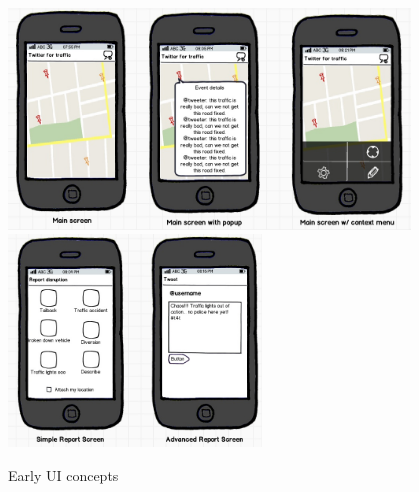 \begin{figure}
\centering
\includegraphics[width=0.95\textwidth]{images/design/client/ui_concepts/ishot-9.jpg}
\includegraphics[width=0.6\textwidth]{images/design/client/ui_concepts/ishot-10.jpg}
\caption{Early UI concepts}
\label{fig:design_concepts}
\end{figure}
